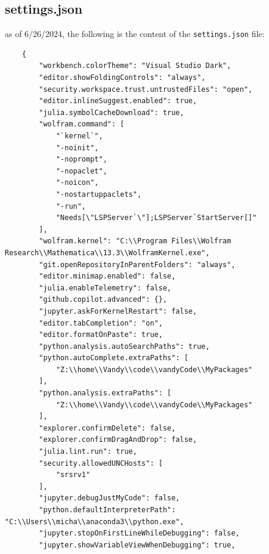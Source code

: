 \documentclass[../../main.tex]{subfiles} %
\begin{document}
\subsection{settings.json}
as of 6/26/2024, the following is the content of the \texttt{settings.json} file:
\begin{lstlisting}
    {
        "workbench.colorTheme": "Visual Studio Dark",
        "editor.showFoldingControls": "always",
        "security.workspace.trust.untrustedFiles": "open",
        "editor.inlineSuggest.enabled": true,
        "julia.symbolCacheDownload": true,
        "wolfram.command": [
            "`kernel`",
            "-noinit",
            "-noprompt",
            "-nopaclet",
            "-noicon",
            "-nostartuppaclets",
            "-run",
            "Needs[\"LSPServer`\"];LSPServer`StartServer[]"
        ],
        "wolfram.kernel": "C:\\Program Files\\Wolfram Research\\Mathematica\\13.3\\WolframKernel.exe",
        "git.openRepositoryInParentFolders": "always",
        "editor.minimap.enabled": false,
        "julia.enableTelemetry": false,
        "github.copilot.advanced": {},
        "jupyter.askForKernelRestart": false,
        "editor.tabCompletion": "on",
        "editor.formatOnPaste": true,
        "python.analysis.autoSearchPaths": true,
        "python.autoComplete.extraPaths": [
            "Z:\\home\\Vandy\\code\\vandyCode\\MyPackages"
        ],
        "python.analysis.extraPaths": [
            "Z:\\home\\Vandy\\code\\vandyCode\\MyPackages"
        ],
        "explorer.confirmDelete": false,
        "explorer.confirmDragAndDrop": false,
        "julia.lint.run": true,
        "security.allowedUNCHosts": [
            "srsrv1"
        ],
        "jupyter.debugJustMyCode": false,
        "python.defaultInterpreterPath": "C:\\Users\\micha\\anaconda3\\python.exe",
        "jupyter.stopOnFirstLineWhileDebugging": false,
        "jupyter.showVariableViewWhenDebugging": true,
    

\end{lstlisting}
\end{document}
